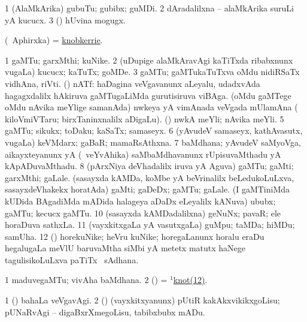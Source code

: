 \bentry
{}
\gl{\nA}
\bmng
\bnum
\num{1} (AlaMkArika) gubuTu; gubibx; guMDi. 
\num{2} dAradalilxna -- alaMkArika suruLi yA kucucx. 
\num{3} (\pArxparx) hUvina mogugx. 
\enum
\emng
\eentry

\bentry
{}
\gl{\nA}
\bmng
(\da\ Aphirxka)  = \hyperlink{knobkerrie}{knobkerrie}. 
\emng
\eentry

\bentry
{}
\gl{\nA}
\bmng
\bnum
\num{1} gaMTu; garxMthi; kuNike. 
\num{2} (uDupige alaMkAravAgi kaTiTxda ribabxnunx \mo vugaLa) kucucx; kaTuTx; goMDe. 
\num{3} gaMTu; gaMTukaTuTxva oMdu nidiRSaTx vidhAna, riVti. 
 (\nw) nATf: 
\banum
{} haDagina veVgavanunx aLeyalu, udadxvAda hagagxdalilx hAkiruva gaMTugaLiMda gurutisiruva viBAga. 
 (oMdu gaMTege oMdu nAvika meYlige samanAda) nwkeya yA vimAnada veVgada mUlamAna (\su\  kiloVmiVTaru; birxTaninxnalilx  aDigaLu). 
 (\saDi) nwkA meYli; nAvika meYli. 
\eanum
\numie
\num{5} gaMTu; sikukx; toDaku; kaSaTx; samaseyx. 
\num{6} (yAvudeV samaseyx, kathAvasutx, \mo vugaLa) keVMdarx; gaBaR; mamaRsAthxna. 
\num{7} baMdhana; yAvudeV saMyoVga, aikayxteyanunx yA (\kanmu\ veYvAhika) saMbaMdhavanunx rUpisuvaMthadu yA kApADuvaMthadu. 
\num{8} (pArxNiya deVhadalilx iruva yA Aguva) gaMTu; gaMti; garxMthi; gaLale. 
 (sasayxda kAMDa, koMbe yA beVrinalilx beLedukoLuLxva, sasayxdeVhakekx horatAda) 
\banum
{} gaMti; gaDeDx; gaMTu; gaLale. 
 (I gaMTiniMda kUDida BAgadiMda mADida halageya aDaDx eLeyalilx kANuva) ububx; gaMTu; kecucx gaMTu. 
\eanum
\numie
\num{10} (sasayxda kAMDadalilxna) geNuNx; pavaR; ele horaDuva sathxLa. 
\num{11} (vayxkitxgaLa yA vasutxgaLa) guMpu; taMDa; hiMDu; samUha. 
\hypertarget{knot(1)12}{} 
\num{12} (\birx) horekuNike; heVru kuNike; horegaLanunx horalu eraDu hegalugaLa meVlU baruvaMtha siMbi yA metetx matutx haNege tagulisikoLuLxva paTiTx \mo\ sAdhana. 
\enum
\emng

\noindent
\gl{\pagu}
\bmng
\bnum
\num{1}  maduvegaMTu; vivAha baMdhana. 
\num{2}  (\birx) = \hyperlink{knot(1)12}{$^1$knot(12)}. 
\enum
\emng

\noindent\gl{\nuga}
\bmng
\bnum
\num{1}  (\AmA) bahaLa veVgavAgi. 
\num{2}  (\AmA) (vayxkitxyanunx) pUtiR kakAkxvikikxgoLisu; pUNaRvAgi -- digaBxrXmegoLisu, tabibxbubx mADu. 
\enum
\emng
\eentry

\bentry
{}
\gl{\kirx}


